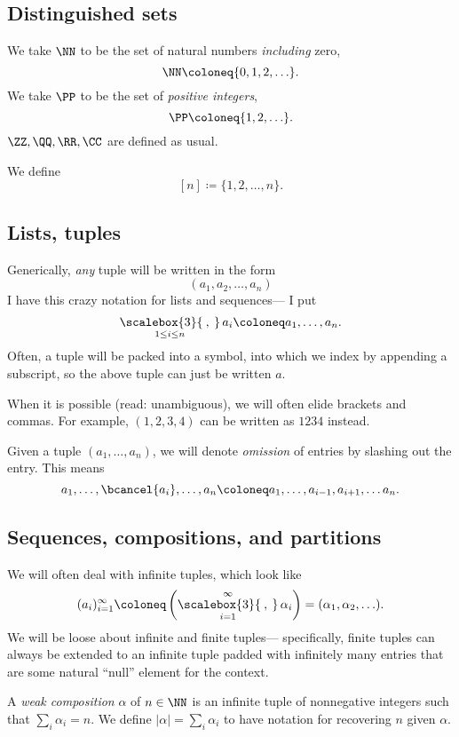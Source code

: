 \documentclass{article}
\newcommand{\bigcomma}{\ensuremath{\mathop{\scalebox{3}{\:,\:}}\limits}}
\begin{document}

\subsection*{Distinguished sets}

We take $\NN$ to be the set of natural numbers \textit{including} zero,
\[
    \NN
    \coloneq
    \{0,1,2,\ldots\}.
\]
We take $\PP$ to be the set of \textit{positive integers},
\[
    \PP
    \coloneq
    \{1,2,\ldots\}.
\]
$\ZZ,\QQ,\RR,\CC$ are defined as usual.

We define
\[
    [n]
    \coloneq
    \{1,2,\ldots,n\}.
\]

\subsection*{Lists, tuples}

Generically, \textit{any} tuple will be written in the form
\[
    (a_1, a_2, \ldots, a_n)
\]
I have this crazy notation for lists and sequences--- I put
\[
    \bigcomma_{1\leq i \leq n}a_i
    \coloneq
    a_1,\ldots,a_n.
\]
Often, a tuple will be packed into a symbol, into which we index by appending a subscript, so the above tuple can just be written $a$.

When it is possible (read: unambiguous), we will often elide brackets and commas. 
For example, $(1,2,3,4)$ can be written as $1234$ instead.

Given a tuple $(a_1,\ldots,a_n)$, we will denote \textit{omission} of entries by slashing out the entry.
This means
\[
    a_1,\ldots,\bcancel{a_i},\ldots,a_n
    \coloneq
    a_1,\ldots,a_{i-1},a_{i+1},\ldots a_n.
\]

\subsection*{Sequences, compositions, and partitions}

We will often deal with infinite tuples, which look like
\[
    (a_i)_{i=1}^\infty
    \coloneq
    \left(
        \bigcomma_{i=1}^\infty \alpha_i
    \right)
    =
    (\alpha_1, \alpha_2, \ldots).
\]
We will be loose about infinite and finite tuples--- specifically, finite tuples can always be extended to an infinite tuple padded with infinitely many entries that are some natural ``null'' element for the context.

A \textit{weak composition} $\alpha$ of $n \in \NN$ is an infinite tuple of nonnegative integers 
such that $\sum_i \alpha_i = n$. 
We define $|\alpha| = \sum_i \alpha_i$ to have notation for recovering $n$ given $\alpha$.
\end{document}
